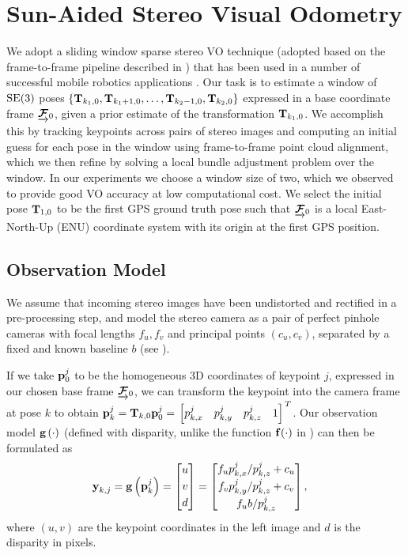 \section{Sun-Aided Stereo Visual Odometry} 
\label{sec:sun_bcnn-stereo-vo}
We adopt a sliding window sparse stereo VO technique (adopted based on the frame-to-frame pipeline described in ) that has been used in a number of successful mobile robotics applications \citep{Cheng2006-nl,Furgale2010-to,Geiger2011-xe,Kelly2008-mh}.
Our task is to estimate a window of $\mathrm{SE}(3)$ poses $\left\{\boldsymbol{\mathbf{T}}_{k_1,0}, \boldsymbol{\mathbf{T}}_{k_1+1,0}, \dots, \boldsymbol{\mathbf{T}}_{k_2-1, 0}, \boldsymbol{\mathbf{T}}_{k_2, 0}\right\}$ expressed in a base coordinate frame $\underrightarrow{ \boldsymbol{\mathbf{\mathcal{F}}} }_{0}$, given a prior estimate of the transformation $\boldsymbol{\mathbf{T}}_{k_1,0}$.
We accomplish this by tracking keypoints across pairs of stereo images and computing an initial guess for each pose in the window using frame-to-frame point cloud alignment, which we then refine by solving a local bundle adjustment problem over the window.
In our experiments we choose a window size of two, which we observed to provide good VO accuracy at low computational cost. 
We select the initial pose $\boldsymbol{\mathbf{T}}_{1,0}$ to be the first GPS ground truth pose such that $\underrightarrow{ \boldsymbol{\mathbf{\mathcal{F}}} }_{0}$ is a local East-North-Up (ENU) coordinate system with its origin at the first GPS position.

\subsection{Observation Model}
We assume that incoming stereo images have been undistorted and rectified in a pre-processing step, and model the stereo camera as a pair of perfect pinhole cameras with focal lengths $f_u, f_v$ and principal points $\left(c_u,c_v\right)$, separated by a fixed and known baseline $b$ (see ).

If we take $\boldsymbol{\mathbf{p}}_0^j$ to be the homogeneous 3D coordinates of keypoint $j$, expressed in our chosen base frame $\underrightarrow{ \boldsymbol{\mathbf{\mathcal{F}}} }_{0}$, we can transform the keypoint into the camera frame at pose $k$ to obtain $\boldsymbol{\mathbf{p}}_k^j = \boldsymbol{\mathbf{T}}_{k,0}\boldsymbol{\mathbf{p}}_0^j = \left.{\begin{bmatrix} p_{k,x}^j & p_{k,y}^j & p_{k,z}^j & 1 \end{bmatrix}}\right.^T$. Our observation model $\boldsymbol{\mathbf{g}}\left(\cdot\right)$ (defined with disparity, unlike the function $\boldsymbol{\mathbf{f}}(\cdot)$ in ) can then be formulated as
\begin{align} \label{eq:cam_model}
    \Vector{y}_{k,j} &= \CameraModel{\Keypoint_k^j}
                    = \bbm u \\ v \T \\ d \T \ebm 
                    = \bbm 
			   		    f_u \KeypointComponent_{k,x}^j / \KeypointComponent_{k,z}^j + c_u \\
			   		    f_v \KeypointComponent_{k,y}^j / \KeypointComponent_{k,z}^j + c_v \T \\
			   		    f_u b / \KeypointComponent_{k,z}^j  \T
			         \ebm,
\end{align}
where $\left(u,v\right)$ are the keypoint coordinates in the left image and $d$ is the disparity in pixels.

